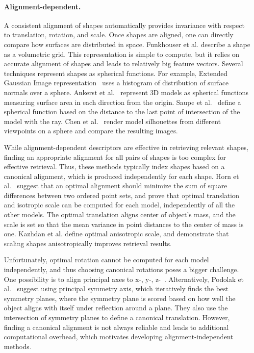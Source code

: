 \paragraph*{Alignment-dependent.}
A consistent alignment of shapes automatically provides invariance with respect to translation, rotation, and scale. Once shapes are aligned, one can directly compare how surfaces are distributed in space. Funkhouser et al. \cite{Funkhouser:2003:ASE} describe a shape as a volumetric grid.
This representation is simple to compute, but it relies on accurate alignment of shapes and leads to relatively big feature vectors. Several techniques represent shapes as spherical functions. For example, Extended Gaussian Image representation~\cite{Horn:1984:EGI} uses a histogram of distribution of surface normals over a sphere. Ankerst et al.~\cite{Ankerst:1999:3dsh} represent 3D models as spherical functions measuring surface area in each direction from the origin. Saupe et al.~\cite{Saupe:2001:MRS} define a spherical function based on the distance to the last point of intersection of the model with the ray. Chen et al.~\cite{Chen:2003:ovsb} render model silhouettes from different viewpoints on a sphere and compare the resulting images.

While alignment-dependent descriptors are effective in retrieving relevant shapes, finding an appropriate alignment for all pairs of shapes is too complex for effective retrieval.  Thus, these methods typically index shapes based on a canonical alignment, which is produced independently for each shape.  Horn et al.~\cite{Horn:1987:cfs,Horn:1988:cfs} suggest that an optimal alignment should minimize the sum of square differences between two ordered point sets, and prove that optimal translation and isotropic scale can be computed for each model, independently of all the other models. The optimal translation aligns center of object's mass, and the scale is set so that the mean variance in point distances to the center of mass is one. Kazhdan et al. \cite{Kazhdan:2004:SMA} define optimal anisotropic scale, and demonstrate that scaling shapes anisotropically improves retrieval results.

Unfortunately, optimal rotation cannot be computed for each model independently, and thus choosing canonical rotations poses a bigger challenge. One possibility is to align principal axes to x-, y-, z-~\cite{Duda:2000:PC}. Alternatively, Podolak et al.~\cite{Podolak:2006:PRST} suggest using principal symmetry axis, which iteratively finds the best symmetry planes, 
where the symmetry plane is scored based on how well the object aligns with itself under reflection around a plane. They also use the intersection of symmetry planes to define a canonical translation. 
However, finding a canonical alignment is not always reliable and leads to additional computational overhead, which motivates developing alignment-independent methods.

